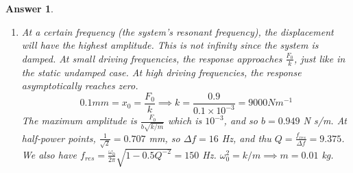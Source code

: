 \documentclass[a4paper]{article}
\newtheorem{ans}{Answer}[subsection]
\theoremstyle{new}
\begin{document}
\begin{ans}
\begin{enumerate}[label=(\alph*)]
$$x(t)=e^{-bt/2m}(x_0\cos\omega t+\frac{1}{\omega_0}\bigg(v_0+\frac{b}{2m}x_0\bigg)\sin\omega t)$$
\item At a certain frequency (the system's resonant frequency), the displacement will have the highest amplitude. This is not infinity since the system is damped. At small driving frequencies, the response approaches $\frac{F_0}{k}$, just like in the static undamped case. At high driving frequencies, the response asymptotically reaches zero.
$$0.1mm=x_0=\frac{F_0}{k}\implies k=\frac{0.9}{0.1\times10^{-3}}=9000 Nm^{-1}$$
The maximum amplitude is $\frac{F_0}{b\sqrt{k/m}}$ which is $10^{-3}$, and so $b=0.949$ N s/m.  At half-power points, $\frac{1}{\sqrt{2}}=0.707$ mm, so $\Delta f=16$ Hz, and thu $Q=\frac{f_{res}}{\Delta f}=9.375$. We also have $f_{res}=\frac{\omega_0}{2\pi}\sqrt{1-0.5Q^{-2}}=150$ Hz. $\omega_0^2=k/m\implies m=0.01$ kg.
\end{enumerate}
\end{ans}
\newpage
\end{document}
